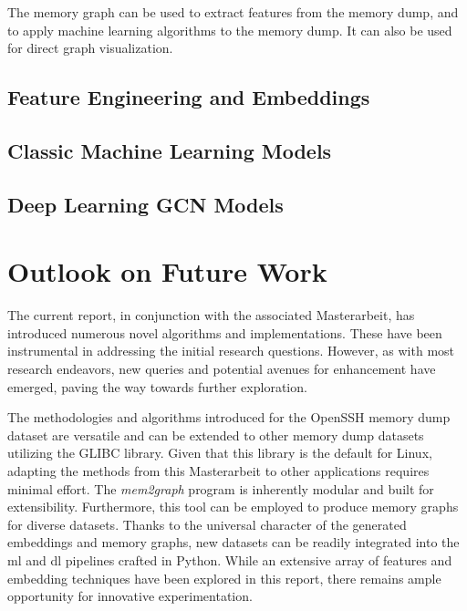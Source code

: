 The memory graph can be used to extract features from the memory dump, and to apply machine learning algorithms to the memory dump. It can also be used for direct graph visualization.

\subsection{Feature Engineering and Embeddings}

\subsection{Classic Machine Learning Models}

\subsection{Deep Learning GCN Models}


\section{Outlook on Future Work}\label{conclusion:sec:future_work}


The current report, in conjunction with the associated Masterarbeit, has introduced numerous novel algorithms and implementations. These have been instrumental in addressing the initial research questions. However, as with most research endeavors, new queries and potential avenues for enhancement have emerged, paving the way towards further exploration.

The methodologies and algorithms introduced for the OpenSSH memory dump dataset are versatile and can be extended to other memory dump datasets utilizing the GLIBC library. Given that this library is the default for Linux, adapting the methods from this Masterarbeit to other applications requires minimal effort. The \textit{mem2graph} program is inherently modular and built for extensibility. Furthermore, this tool can be employed to produce memory graphs for diverse datasets. Thanks to the universal character of the generated embeddings and memory graphs, new datasets can be readily integrated into the \acrshort{ml} and \acrshort{dl} pipelines crafted in Python. While an extensive array of features and embedding techniques have been explored in this report, there remains ample opportunity for innovative experimentation.

